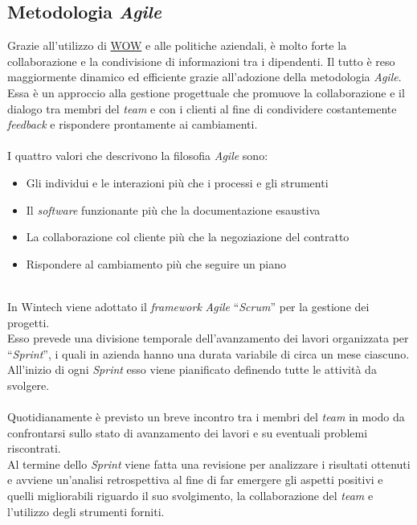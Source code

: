 \subsection{Metodologia \emph{Agile}}
Grazie all'utilizzo di \hyperref[WOW]{WOW} e alle politiche aziendali, è molto forte la collaborazione e la condivisione di informazioni tra i dipendenti. Il tutto è reso maggiormente dinamico ed efficiente grazie all'adozione della metodologia \emph{Agile}.\\
Essa è un approccio alla gestione progettuale che promuove la collaborazione e il dialogo tra membri del \emph{team} e con i clienti al fine di condividere costantemente \emph{feedback} e rispondere prontamente ai cambiamenti.\\\\
I quattro valori che descrivono la filosofia \emph{Agile} sono:
\begin{itemize}
    \item Gli individui e le interazioni più che i processi e gli strumenti 
    \item Il \emph{software} funzionante più che la documentazione esaustiva  
    \item La collaborazione col cliente più che la negoziazione del contratto 
    \item Rispondere al cambiamento più che seguire un piano\\\\
\end{itemize}
In Wintech viene adottato il \emph{framework} \emph{Agile} “\emph{Scrum}” per la gestione dei progetti.\\
Esso prevede una divisione temporale dell'avanzamento dei lavori organizzata per “\emph{Sprint}”, i quali in azienda hanno una durata variabile di circa un mese ciascuno.\\
All'inizio di ogni \emph{Sprint} esso viene pianificato definendo tutte le attività da svolgere.\\\\
Quotidianamente è previsto un breve incontro tra i membri del \emph{team} in modo da confrontarsi sullo stato di avanzamento dei lavori e su eventuali problemi riscontrati.\\
Al termine dello \emph{Sprint} viene fatta una revisione per analizzare i risultati ottenuti e avviene un'analisi retrospettiva al fine di far emergere gli aspetti positivi e quelli migliorabili riguardo il suo svolgimento, la collaborazione del \emph{team} e l'utilizzo degli strumenti forniti.\\\\


